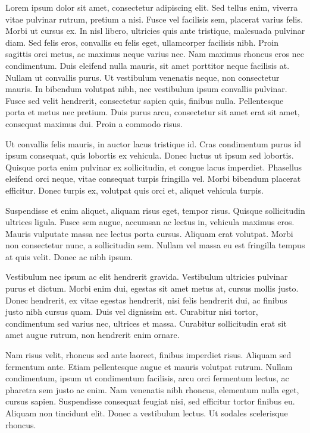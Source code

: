 Lorem ipsum dolor sit amet, consectetur adipiscing elit. Sed tellus enim, viverra vitae pulvinar rutrum, pretium a nisi. Fusce vel facilisis sem, placerat varius felis. Morbi ut cursus ex. In nisl libero, ultricies quis ante tristique, malesuada pulvinar diam. Sed felis eros, convallis eu felis eget, ullamcorper facilisis nibh. Proin sagittis orci metus, ac maximus neque varius nec. Nam maximus rhoncus eros nec condimentum. Duis eleifend nulla mauris, sit amet porttitor neque facilisis at. Nullam ut convallis purus. Ut vestibulum venenatis neque, non consectetur mauris. In bibendum volutpat nibh, nec vestibulum ipsum convallis pulvinar. Fusce sed velit hendrerit, consectetur sapien quis, finibus nulla. Pellentesque porta et metus nec pretium. Duis purus arcu, consectetur sit amet erat sit amet, consequat maximus dui. Proin a commodo risus.

Ut convallis felis mauris, in auctor lacus tristique id. Cras condimentum purus id ipsum consequat, quis lobortis ex vehicula. Donec luctus ut ipsum sed lobortis. Quisque porta enim pulvinar ex sollicitudin, et congue lacus imperdiet. Phasellus eleifend orci neque, vitae consequat turpis fringilla vel. Morbi bibendum placerat efficitur. Donec turpis ex, volutpat quis orci et, aliquet vehicula turpis.

Suspendisse et enim aliquet, aliquam risus eget, tempor risus. Quisque sollicitudin ultrices ligula. Fusce sem augue, accumsan ac lectus in, vehicula maximus eros. Mauris vulputate massa nec lectus porta cursus. Aliquam erat volutpat. Morbi non consectetur nunc, a sollicitudin sem. Nullam vel massa eu est fringilla tempus at quis velit. Donec ac nibh ipsum.

Vestibulum nec ipsum ac elit hendrerit gravida. Vestibulum ultricies pulvinar purus et dictum. Morbi enim dui, egestas sit amet metus at, cursus mollis justo. Donec hendrerit, ex vitae egestas hendrerit, nisi felis hendrerit dui, ac finibus justo nibh cursus quam. Duis vel dignissim est. Curabitur nisi tortor, condimentum sed varius nec, ultrices et massa. Curabitur sollicitudin erat sit amet augue rutrum, non hendrerit enim ornare.

Nam risus velit, rhoncus sed ante laoreet, finibus imperdiet risus. Aliquam sed fermentum ante. Etiam pellentesque augue et mauris volutpat rutrum. Nullam condimentum, ipsum ut condimentum facilisis, arcu orci fermentum lectus, ac pharetra sem justo ac enim. Nam venenatis nibh rhoncus, elementum nulla eget, cursus sapien. Suspendisse consequat feugiat nisi, sed efficitur tortor finibus eu. Aliquam non tincidunt elit. Donec a vestibulum lectus. Ut sodales scelerisque rhoncus. 

\bye 
